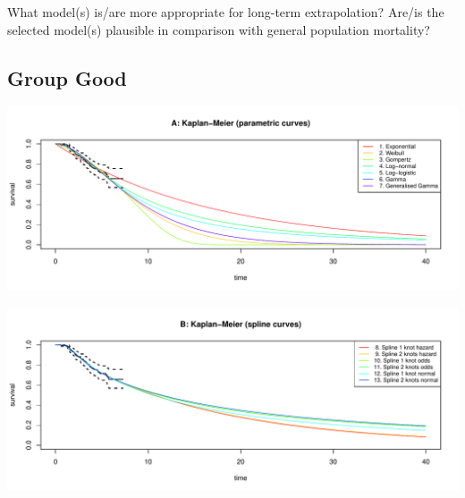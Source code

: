 \documentclass[]{article}
\begin{document}
What model(s) is/are more appropriate for long-term extrapolation?
Are/is the selected model(s) plausible in comparison with general
population mortality?

\subsection{Group Good}\label{group-good}

\begin{flushleft}\includegraphics[height=0.29\textheight]{images/validate_extrapolation1-1} \end{flushleft}

\begin{flushleft}\includegraphics[height=0.29\textheight]{images/validate_extrapolation1-2} \end{flushleft}
\end{document}

